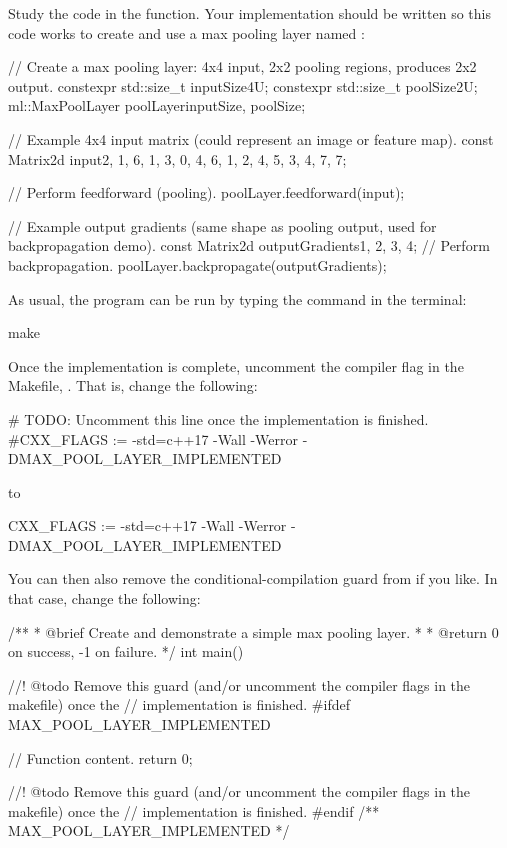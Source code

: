 Study the code in the  function. Your implementation should be written so this code
works to create and use a max pooling layer named :

\begin{cppcode}
// Create a max pooling layer: 4x4 input, 2x2 pooling regions, produces 2x2 output.
constexpr std::size_t inputSize{4U};
constexpr std::size_t poolSize{2U};
ml::MaxPoolLayer poolLayer{inputSize, poolSize};

// Example 4x4 input matrix (could represent an image or feature map).
const Matrix2d input{{2, 1, 6, 1},
                     {3, 0, 4, 6},
                     {1, 2, 4, 5},
                     {3, 4, 7, 7}};

// Perform feedforward (pooling).
poolLayer.feedforward(input);

// Example output gradients (same shape as pooling output, used for backpropagation demo).
const Matrix2d outputGradients{{1, 2},
                               {3, 4}};
// Perform backpropagation.
poolLayer.backpropagate(outputGradients);
\end{cppcode}

\label{c7:ex:3}
As usual, the program can be run by typing the command  in the terminal:

\begin{shell}
make
\end{shell}

\noindent Once the implementation is complete, uncomment the compiler flag  in the
Makefile, . That is, change the following:

\begin{makecode}
# TODO: Uncomment this line once the implementation is finished.
#CXX_FLAGS := -std=c++17 -Wall -Werror -DMAX_POOL_LAYER_IMPLEMENTED
\end{makecode}

\noindent to

\begin{makecode}
CXX_FLAGS := -std=c++17 -Wall -Werror -DMAX_POOL_LAYER_IMPLEMENTED
\end{makecode}

\noindent You can then also remove the conditional-compilation guard
 from  if you like. In that case, change
the following:

\begin{cppcode}
/**
 * @brief Create and demonstrate a simple max pooling layer.
 *
 * @return 0 on success, -1 on failure.
 */
int main()
{
//! @todo Remove this guard (and/or uncomment the compiler flags in the makefile) once the
//        implementation is finished.
#ifdef MAX_POOL_LAYER_IMPLEMENTED

    // Function content.
    return 0;

//! @todo Remove this guard (and/or uncomment the compiler flags in the makefile) once the
//        implementation is finished.
#endif /** MAX_POOL_LAYER_IMPLEMENTED */
}
\end{cppcode}

